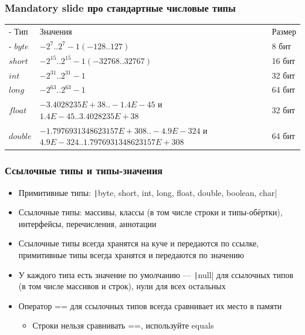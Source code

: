 \documentclass[xetex,mathserif,serif]{beamer}
\begin{document}
	\begin{frame}
		\frametitle{Mandatory slide про стандартные числовые типы}
		\begin{tabu} {| X[0.3 l p] | X[1 l p] | X[0.2 l p] |}
			\tabucline-
			Тип       & Значения                                                                              & Размер  \\
			\tabucline-
			\everyrow{\tabucline-}
			$byte$    & $-2^7..2^7-1 (-128..127)$                                                             & 8 бит   \\
			$short$   & $-2^{15}..2^{15}-1 (-32768..32767)$                                                       & 16 бит  \\
			$int$     & $-2^{31}..2^{31}-1$                                                                       & 32 бит  \\
			$long$    & $-2^{63} .. 2^{63}-1$                                                                     & 64 бит  \\
			$float$   & $-3.4028235E+38..-1.4E-45$ \newline и $1.4E-45..3.4028235E+38$                        & 32 бит  \\
			$double$  & $-1.7976931348623157E+308..-4.9E-324$ \newline и $4.9E-324..1.7976931348623157E+308$  & 64 бит  \\
		\end{tabu}
	\end{frame}

	\begin{frame}
		\frametitle{Ссылочные типы и типы-значения}
		\begin{itemize}
			\item Примитивные типы: \texttt|byte, short, int, long, float, double, boolean, char|
			\item Ссылочные типы: массивы, классы (в том числе строки и типы-обёртки), интерфейсы, перечисления, аннотации
			\item Ссылочные типы всегда хранятся на куче и передаются по ссылке, примитивные типы всегда хранятся и передаются по значению
			\item У каждого типа есть значение по умолчанию --- \texttt|null| для ссылочных типов (в том числе массивов и строк), нули для всех остальных
			\item Оператор == для ссылочных типов всегда сравнивает их место в памяти
			\begin{itemize}
				\item Строки нельзя сравнивать ==, используйте equals
			\end{itemize}
		\end{itemize}
	\end{frame}
\end{document}
